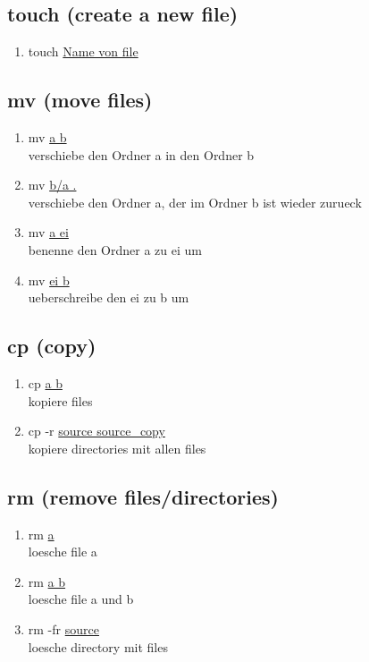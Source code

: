 \documentclass[10pt,a4paper]{scrartcl}
\begin{document}
\subsection{touch (create a new file)} 
\begin{enumerate}
	\item {touch \underline{Name von file}}
\end{enumerate}

\subsection{mv (move files)}
\begin{enumerate}
	\item {mv \underline{a b}}\\
	      {\small{verschiebe den Ordner a in den Ordner b}}
	\item {mv \underline{b/a .}}\\
	      {\small {verschiebe den Ordner a, der im Ordner b ist wieder zurueck}}
	\item {mv \underline{a ei}}\\
	      {\small{benenne den Ordner a zu ei um}}
	\item {mv \underline{ei b}}\\
	      {\small{ueberschreibe den ei zu b um}}

\end{enumerate}

		
\subsection{cp (copy)}
\begin{enumerate}
	\item {cp \underline{a b}}\\
	      {\small{kopiere files}}
	\item {cp -r \underline{source source_copy}}\\
	      {\small{kopiere directories mit allen files}}\\

\end{enumerate}

\subsection{rm (remove files/directories)}
\begin{enumerate}
	\item {rm \underline{a}}\\
	      {\small{loesche file a}}
	\item {rm \underline{a b}}\\
	      {\small{loesche file a und b}}
	\item {rm -fr \underline{source}}\\
	      {\small{loesche directory mit files}}
\end{enumerate}
\end{document}
